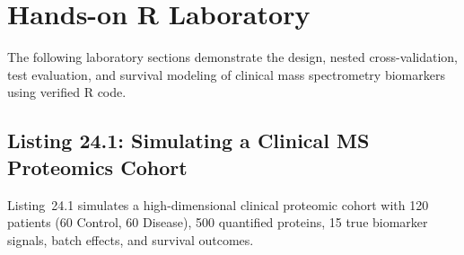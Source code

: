 \documentclass[11pt,twoside,openright]{book}
\begin{document}
\section{Hands-on R Laboratory}

The following laboratory sections demonstrate the design, nested cross-validation, test evaluation, and survival modeling of clinical mass spectrometry biomarkers using verified R code.

\subsection{Listing 24.1: Simulating a Clinical MS Proteomics Cohort}

Listing~24.1 simulates a high-dimensional clinical proteomic cohort with 120 patients (60 Control, 60 Disease), 500 quantified proteins, 15 true biomarker signals, batch effects, and survival outcomes.
\end{document}
